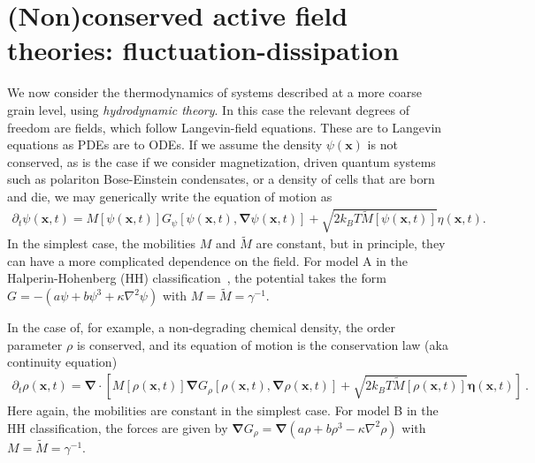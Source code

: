 \section{(Non)conserved active field theories: fluctuation-dissipation}



We now consider the thermodynamics of systems described at a more coarse grain level, using \emph{hydrodynamic theory}. 
In this case the relevant degrees of freedom are fields, which follow Langevin-field equations.
These are to Langevin equations as PDEs are to ODEs.
If we assume the density $\psi(\bm x)$ is not conserved, as is the case if we consider magnetization, driven quantum systems such as polariton Bose-Einstein condensates, or a density of cells that are born and die, we may generically write the equation of motion as
%
\begin{align}
    \partial_t \psi(\bm x, t) 
    = M[\psi(\bm x, t)] G_\psi[\psi(\bm x, t), \bm \nabla \psi(\bm x, t)] 
    + \sqrt{ 2 k_B T \tilde M[\psi(\bm x, t)] } \eta(\bm x, t).
\end{align}
%
In the simplest case, the mobilities $M$ and $\tilde{M}$ are constant, but in principle, they can have a more complicated dependence on the field.
For model A in the Halperin-Hohenberg (HH) classification~\cite{HohenbergRMP}, the potential takes the form $G = -(a \psi + b \psi^3 + \kappa \nabla^2 \psi)$ with $M=\tilde{M}=\gamma^{-1}$. 
%

In the case of, for example, a non-degrading chemical density, the order parameter $\rho$ is conserved, and its equation of motion is the conservation law (aka continuity equation)
%
\begin{align}
    \partial_t \rho(\bm x, t)
    = 
    \bm \nabla\cdot
    \left[
        M[\rho(\bm x, t)]
        \bm \nabla G_\rho[\rho(\bm x, t), \bm \nabla\rho(\bm x, t)]
        + \sqrt{ 2 k_B T \tilde M[\rho(\bm x, t)] }
        \bm \eta(\bm x, t)
    \right]~.
\end{align}
%
Here again, the mobilities are constant in the simplest case.
For model B in the HH classification, the forces are given by $\bm \nabla G_\rho = \bm \nabla (a \rho + b \rho^3 - \kappa \nabla^2 \rho)$ with $M = \tilde{M} = \gamma^{-1}$.

